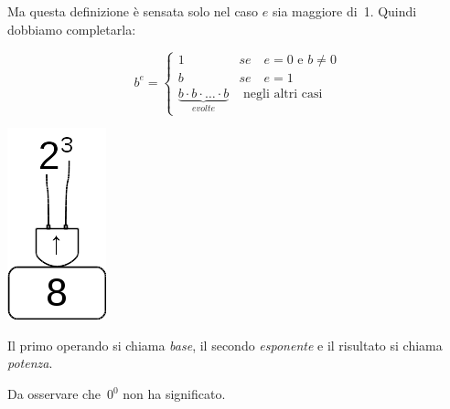 Ma questa definizione è sensata solo nel caso \(e\) sia maggiore di~1.
Quindi dobbiamo completarla:

\begin{inaccessibleblock}[
  \begin{definizione}
    \[
    b^e = \begin{cases}
    1 & se \quad e = 0 \text{ e } b\neq 0\\
    b & se \quad e = 1\\
    \mbox{e volte}{b \cdot b \cdot \dots \cdot b} & \mbox{ 
negli altri casi}
    \end{cases}\]
  \end{definizione}
  ]
  \begin{definizione}
    \[
    b^e = \begin{cases}
    1 & se \quad e = 0 \text{ e } b\neq 0\\
    b & se \quad e = 1\\
    \underbrace{b \cdot b \cdot \dots \cdot b}_{e volte} & 
\text{ negli altri casi}
    \end{cases}\]
  \end{definizione}
\end{inaccessibleblock}


\begin{inaccessibleblock}[]
\begin{minipage}{0.80\textwidth}
 \centering
   
\end{minipage}%
\begin{minipage}{0.15\textwidth}
 \centering
 \includegraphics[scale=0.35]{img/op_pot.png}
\end{minipage}%
\end{inaccessibleblock}

Il primo operando si chiama \emph{base}, il secondo \emph{esponente} e il 
risultato si chiama \emph{potenza}.

Da osservare che~\(0^0\) non ha significato.

